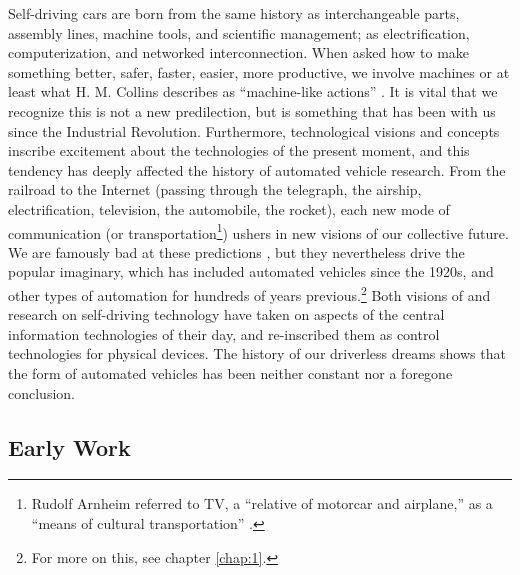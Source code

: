 Self-driving cars are born from the
same history as interchangeable parts, assembly lines, machine tools,
and scientific management; as electrification, computerization, and
networked interconnection. When asked how to make something better,
safer, faster, easier, more productive, we involve machines or at
least what H. M. Collins describes as ``machine-like actions''
\cite[p. 42]{Collins}. It is
vital that we recognize this is not a new predilection, but is
something that has been with us since the Industrial Revolution.
Furthermore, technological visions and concepts inscribe excitement about the
technologies of the present moment, and this tendency has deeply
affected the history of automated vehicle research. From the railroad to the
Internet (passing through the telegraph, the airship, electrification,
television, the automobile, the rocket), each new mode of
communication (or transportation\footnote{Rudolf Arnheim referred to
  TV, a ``relative of motorcar and airplane,'' as a ``means of
  cultural transportation'' \cite[p. 194]{arnheim}.}) ushers in new visions of our
collective future. We are famously bad at these predictions \cite{vanriper}, but they
nevertheless drive the popular imaginary, which has included automated
vehicles since the 1920s, and other types of automation for hundreds
of years previous.\footnote{For more on this, see chapter
  \ref{chap:1}.} Both visions of and research on self-driving
technology have taken on aspects of the central information
technologies of their day, and re-inscribed them as control
technologies for physical devices. The history of our driverless
dreams shows that the form of automated vehicles has been neither
constant nor a foregone conclusion.

\subsection{Early Work}

